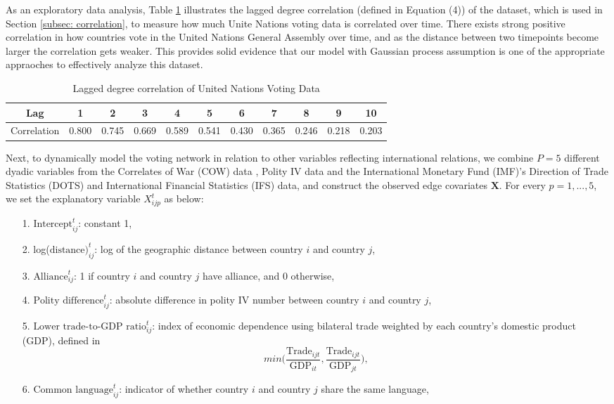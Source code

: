 \documentclass[a4paper]{article}
\begin{document}
As an exploratory data analysis, Table \ref{table:corr} illustrates the lagged degree correlation (defined in Equation (4)) of the dataset, which is used in Section \ref{subsec: correlation}, to measure how much Unite Nations voting data is correlated over time. There exists strong positive correlation in how countries vote in the United Nations General Assembly over time, and as the distance between two timepoints become larger the correlation gets weaker. This provides solid evidence that our model with Gaussian process assumption is one of the appropriate appraoches to effectively analyze this dataset.
\begin{table}[ht]
	\centering
	\begin{tabular}{ |c|c|c|c|c|c|c|c|c|c|c|} 
		\hline
		{Lag}	& 1 & 2& 3& 4& 5& 6& 7&8&9&10 \\ \hline
		Correlation & 0.800&0.745&0.669&0.589&0.541&0.430&0.365&0.246&0.218& 0.203\\\hline
	\end{tabular}
	\caption {Lagged degree correlation of United Nations Voting Data}
	\label{table:corr}
\end{table}
\newline Next, to dynamically model the voting network in relation to other variables reflecting international relations,  we combine $P=5$ different dyadic variables from the Correlates of War (COW) data \citep{gibler2008international}, Polity IV data \citep{marshall2014polity} and the International Monetary Fund (IMF)'s Direction of Trade Statistics (DOTS) and International Financial Statistics (IFS) data, and construct the observed edge covariates $\mathbf{X}$. For every $p=1,...,5$, we set the explanatory variable $X^t_{ijp}$ as below:
\begin{itemize}
	\item [1.] $\mbox{Intercept}^t_{ij}$: constant 1,
	\item [2.] log($\mbox{distance})^t_{ij}$: log of the geographic distance between country $i$ and country $j$,
	\item [3.] $\mbox{Alliance}^t_{ij}$: 1 if country $i$ and country $j$ have alliance, and 0 otherwise,
	\item [4.] $\mbox{Polity difference}^t_{ij}$: absolute difference in polity IV number between country $i$ and country $j$,
	\item [5.] $\mbox{Lower trade-to-GDP ratio}^t_{ij}$: index of economic dependence using bilateral trade weighted by each country's domestic product (GDP), defined in \cite{gartzke2000preferences} $$min\Big(\frac{\mbox{Trade}_{ijt}}{\mbox{GDP}_{it}}, \frac{\mbox{Trade}_{ijt}}{\mbox{GDP}_{jt}}\Big),$$
	\item [6.] $\mbox{Common language}^t_{ij}$: indicator of whether country $i$ and country $j$ share the same language,
\end{itemize}
\end{document}
